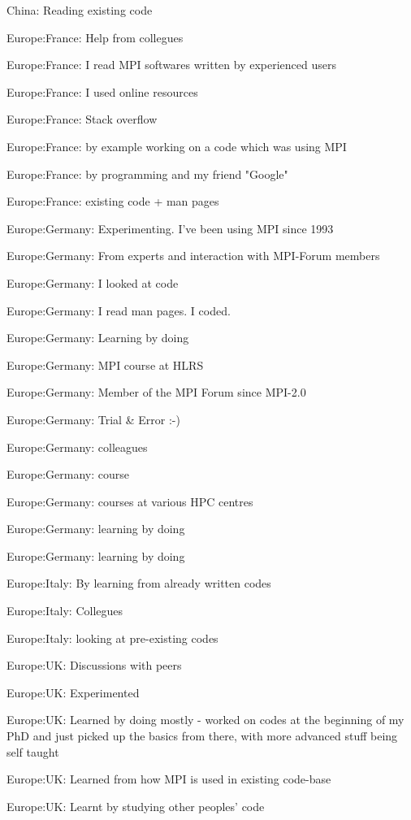 \item China: Reading existing code
\item Europe:France: Help from collegues
\item Europe:France: I read MPI softwares written by experienced users
\item Europe:France: I used online resources
\item Europe:France: Stack overflow
\item Europe:France: by example working on a code which was using MPI
\item Europe:France: by programming and my friend "Google"
\item Europe:France: existing code + man pages
\item Europe:Germany: Experimenting. I've been using MPI since 1993
\item Europe:Germany: From experts and interaction with MPI-Forum members
\item Europe:Germany: I looked at code
\item Europe:Germany: I read man pages. I coded.
\item Europe:Germany: Learning by doing
\item Europe:Germany: MPI course at HLRS
\item Europe:Germany: Member of the MPI Forum since MPI-2.0
\item Europe:Germany: Trial \& Error :-)
\item Europe:Germany: colleagues
\item Europe:Germany: course
\item Europe:Germany: courses at various HPC centres
\item Europe:Germany: learning by doing
\item Europe:Germany: learning by doing
\item Europe:Italy: By learning from already written codes
\item Europe:Italy: Collegues
\item Europe:Italy: looking at pre-existing codes
\item Europe:UK: Discussions with peers
\item Europe:UK: Experimented
\item Europe:UK: Learned by doing mostly - worked on codes at the beginning of my PhD and just picked up the basics from there, with more advanced stuff being self taught
\item Europe:UK: Learned from how MPI is used in existing code-base
\item Europe:UK: Learnt by studying other peoples' code
